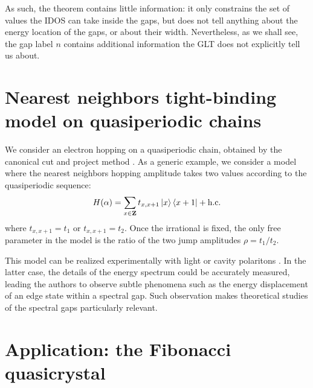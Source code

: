 \documentclass[a4paper]{jpconf}
\begin{document}
As such, the theorem contains little information: it only constrains the set of values the IDOS can take inside the gaps, but does not tell anything about the energy location of the gaps, or about their width.
Nevertheless, as we shall see, the gap label $n$ contains additional information the GLT does not explicitly tell us about.


\section{Nearest neighbors tight-binding model on quasiperiodic chains}

We consider an electron hopping on a quasiperiodic chain, obtained by the canonical cut and project method \cite{baakegrimm}.
As a generic example, we consider a model where the nearest neighbors hopping amplitude takes two values according to the quasiperiodic sequence:
\begin{equation}
	H(\alpha) = \sum_{x \in \mathbf{Z}} t_{x,x+1} \ket{x} \bra{x+1} + \text{h.c.}
\end{equation}
where $t_{x,x+1} = t_1$ or $t_{x,x+1} = t_2$.
Once the irrational is fixed, the only free parameter in the model is the ratio of the two jump amplitudes $\rho = t_1 / t_2$.

This model can be realized experimentally with light \cite{light} or cavity polaritons \cite{polaritons}.
In the latter case, the details of the energy spectrum could be accurately measured, leading the authors to observe subtle phenomena such as the energy displacement of an edge state within a spectral gap.
Such observation makes theoretical studies of the spectral gaps particularly relevant.

\section{Application: the Fibonacci quasicrystal}
\end{document}
